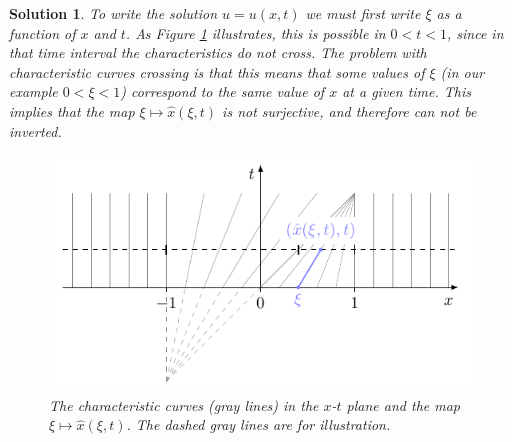 \documentclass[10pt,letterpaper]{article}
\newcommand{\frb}[1]{ \left(  {#1} \right) }
\theoremstyle{break}
\newtheorem{mysolution}{Solution}
\newtheorem*{mysolutioninformation}{Solution Information}
\newenvironment{solution}{\begin{mysolution}}{\end{mysolution}} \newenvironment{solutioninformation}{\begin{mysolutioninformation}}{\end{mysolutioninformation}}
\begin{document}
\begin{solution}
	To write the solution $u=u(x,t)$ we must first write $\xi$ as a function of $x$ and $t$.
	As Figure \ref{carXTplane} illustrates, this is possible in $0<t<1$, since in that time interval the characteristics do not cross.
	The problem with characteristic curves crossing is that this means that some values of $\xi$ (in our example $0<\xi<1$) correspond to the same value of $x$ at a given time.
	This implies that the map $\xi\mapsto \hat x\frb{\xi,t}$ is not surjective, and therefore can not be inverted.
	\begin{figure}
	\centering
	\includegraphics{figures01/charac_t} 
	\caption{The characteristic curves (gray lines) in the $x$-$t$ plane and the map $\xi\mapsto \hat x\frb{\xi,t}$. The dashed gray lines are for illustration.}
	\label{carXTplane}
	\end{figure}
	

\end{solution}
\end{document}
